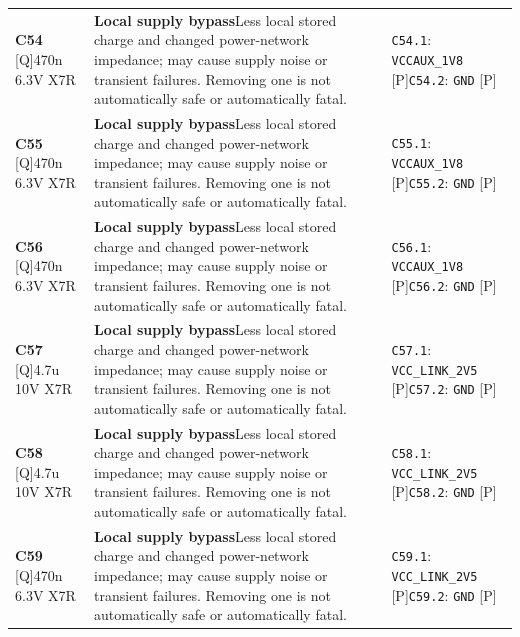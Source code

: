 \documentclass[11pt,a4paper]{article}
\begin{document}
\begin{longtable}{@{}P{27mm}P{77mm}P{62mm}@{}}
\textbf{C54} [Q]\newline 470n 6.3V X7R & \textbf{Local supply bypass}\newline Less local stored charge and changed power-network impedance; may cause supply noise or transient failures. Removing one is not automatically safe or automatically fatal. & \nolinkurl{C54.1}: \nolinkurl{VCCAUX_1V8} [P]\newline \nolinkurl{C54.2}: \nolinkurl{GND} [P] \\
\textbf{C55} [Q]\newline 470n 6.3V X7R & \textbf{Local supply bypass}\newline Less local stored charge and changed power-network impedance; may cause supply noise or transient failures. Removing one is not automatically safe or automatically fatal. & \nolinkurl{C55.1}: \nolinkurl{VCCAUX_1V8} [P]\newline \nolinkurl{C55.2}: \nolinkurl{GND} [P] \\
\textbf{C56} [Q]\newline 470n 6.3V X7R & \textbf{Local supply bypass}\newline Less local stored charge and changed power-network impedance; may cause supply noise or transient failures. Removing one is not automatically safe or automatically fatal. & \nolinkurl{C56.1}: \nolinkurl{VCCAUX_1V8} [P]\newline \nolinkurl{C56.2}: \nolinkurl{GND} [P] \\
\textbf{C57} [Q]\newline 4.7u 10V X7R & \textbf{Local supply bypass}\newline Less local stored charge and changed power-network impedance; may cause supply noise or transient failures. Removing one is not automatically safe or automatically fatal. & \nolinkurl{C57.1}: \nolinkurl{VCC_LINK_2V5} [P]\newline \nolinkurl{C57.2}: \nolinkurl{GND} [P] \\
\textbf{C58} [Q]\newline 4.7u 10V X7R & \textbf{Local supply bypass}\newline Less local stored charge and changed power-network impedance; may cause supply noise or transient failures. Removing one is not automatically safe or automatically fatal. & \nolinkurl{C58.1}: \nolinkurl{VCC_LINK_2V5} [P]\newline \nolinkurl{C58.2}: \nolinkurl{GND} [P] \\
\textbf{C59} [Q]\newline 470n 6.3V X7R & \textbf{Local supply bypass}\newline Less local stored charge and changed power-network impedance; may cause supply noise or transient failures. Removing one is not automatically safe or automatically fatal. & \nolinkurl{C59.1}: \nolinkurl{VCC_LINK_2V5} [P]\newline \nolinkurl{C59.2}: \nolinkurl{GND} [P] \\

\end{longtable}
\end{document}
